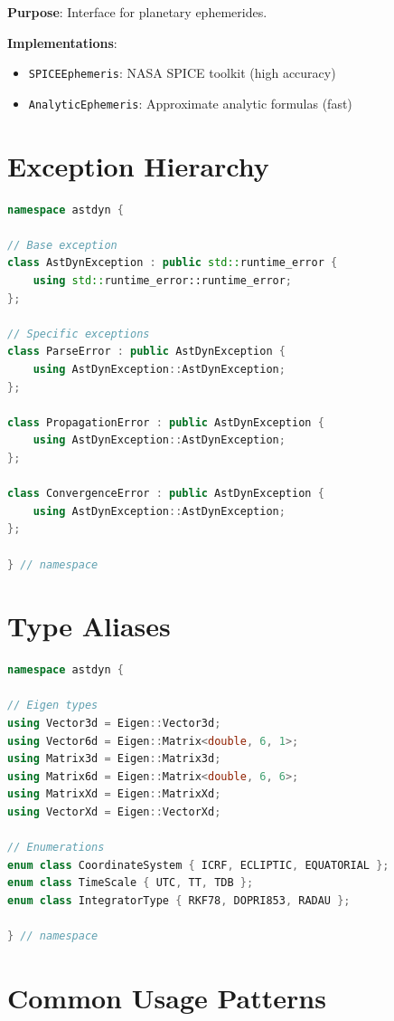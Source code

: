 \textbf{Purpose}: Interface for planetary ephemerides.

\textbf{Implementations}:
\begin{itemize}
    \item \texttt{SPICEEphemeris}: NASA SPICE toolkit (high accuracy)
    \item \texttt{AnalyticEphemeris}: Approximate analytic formulas (fast)
\end{itemize}

\section{Exception Hierarchy}

\begin{lstlisting}[language=C++]
namespace astdyn {

// Base exception
class AstDynException : public std::runtime_error {
    using std::runtime_error::runtime_error;
};

// Specific exceptions
class ParseError : public AstDynException {
    using AstDynException::AstDynException;
};

class PropagationError : public AstDynException {
    using AstDynException::AstDynException;
};

class ConvergenceError : public AstDynException {
    using AstDynException::AstDynException;
};

} // namespace
\end{lstlisting}

\section{Type Aliases}

\begin{lstlisting}[language=C++]
namespace astdyn {

// Eigen types
using Vector3d = Eigen::Vector3d;
using Vector6d = Eigen::Matrix<double, 6, 1>;
using Matrix3d = Eigen::Matrix3d;
using Matrix6d = Eigen::Matrix<double, 6, 6>;
using MatrixXd = Eigen::MatrixXd;
using VectorXd = Eigen::VectorXd;

// Enumerations
enum class CoordinateSystem { ICRF, ECLIPTIC, EQUATORIAL };
enum class TimeScale { UTC, TT, TDB };
enum class IntegratorType { RKF78, DOPRI853, RADAU };

} // namespace
\end{lstlisting}

\section{Common Usage Patterns}

